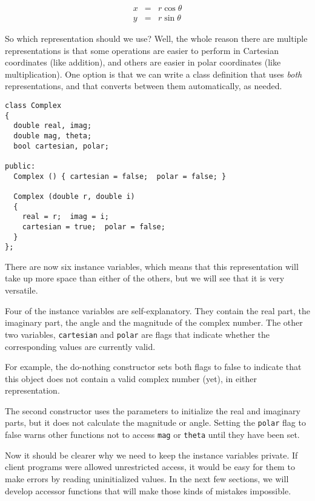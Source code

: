 \begin{eqnarray*}
x       & = &  r \cos \theta \\
y       & = &  r \sin \theta
\end{eqnarray*}

So which representation should we use?  Well, the whole reason there
are multiple representations is that some operations are easier to
perform in Cartesian coordinates (like addition), and others are
easier in polar coordinates (like multiplication).  One option is that
we can write a class definition that uses {\em both} representations,
and that converts between them automatically, as needed.

\begin{lstlisting}
class Complex
{
  double real, imag;
  double mag, theta;
  bool cartesian, polar;

public:
  Complex () { cartesian = false;  polar = false; }

  Complex (double r, double i)
  {
    real = r;  imag = i;
    cartesian = true;  polar = false;
  }
};
\end{lstlisting}
%
There are now six instance variables, which means that
this representation will take up more space than either
of the others, but we will see that it is very versatile.


Four of the instance variables are self-explanatory.  They
contain the real part, the imaginary part, the angle and
the magnitude of the complex number.  The other two
variables, {\tt cartesian} and {\tt polar} are flags that
indicate whether the corresponding values are currently
valid.


For example, the do-nothing constructor sets both flags
to false to indicate that this object does not contain
a valid complex number (yet), in either representation.

The second constructor uses the parameters to initialize
the real and imaginary parts, but it does not calculate the
magnitude or angle.  Setting the {\tt polar} flag to false
warns other functions not to access {\tt mag} or {\tt theta}
until they have been set.

Now it should be clearer why we need to keep the instance
variables private.  If client programs were allowed unrestricted
access, it would be easy for them to make errors by reading
uninitialized values.  In the next few sections, we will
develop accessor functions that will make those kinds of mistakes
impossible.

